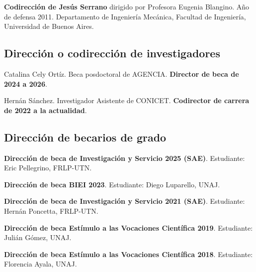 \documentclass[margin,line]{res}
\begin{document}
\begin{resume}
{\bf Codirección de Jesús Serrano} dirigido por Profesora Eugenia Blangino. Año de defensa 2011. Departamento de Ingeniería Mecánica, Facultad de Ingeniería, Universidad de Buenos Aires.

\subsection{  Dirección o codirección de investigadores}

Catalina Cely Ortíz. Beca posdoctoral de AGENCIA. \textbf{Director de beca de 2024 a 2026}.

Hernán Sánchez. Investigador Asistente de CONICET. \textbf{Codirector de carrera de 2022 a la actualidad}.
%
%
%

\subsection{ Dirección de becarios de grado}

{\bf Dirección de beca de Investigación y Servicio 2025 (SAE)}. Estudiante: Eric Pellegrino,  FRLP-UTN.

{\bf Dirección de beca BIEI 2023}. Estudiante: Diego Luparello,  UNAJ.

{\bf Dirección de beca de Investigación y Servicio 2021 (SAE)}. Estudiante: Hernán Poncetta,  FRLP-UTN.

{\bf Dirección de beca Estímulo a las Vocaciones Científica 2019}. Estudiante: Julián Gómez, UNAJ.

{\bf Dirección de beca Estímulo a las Vocaciones Científica 2018}. Estudiante: Florencia Ayala, UNAJ.
%
%
%
%


\end{resume}
\end{document}
